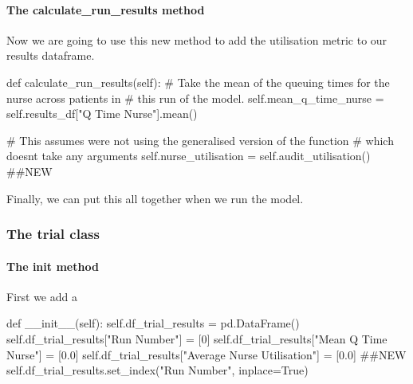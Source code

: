 \documentclass[
  letterpaper,
  DIV=11,
  numbers=noendperiod]{scrreprt}
\let\oldparagraph\paragraph
\renewcommand{\paragraph}[1]{\oldparagraph{#1}\mbox{}}
\newenvironment{Shaded}{\begin{snugshade}}{\end{snugshade}}
\newcommand{\CommentTok}[1]{\textcolor[rgb]{0.37,0.37,0.37}{#1}}
\newcommand{\DecValTok}[1]{\textcolor[rgb]{0.68,0.00,0.00}{#1}}
\newcommand{\FloatTok}[1]{\textcolor[rgb]{0.68,0.00,0.00}{#1}}
\newcommand{\FunctionTok}[1]{\textcolor[rgb]{0.28,0.35,0.67}{#1}}
\newcommand{\KeywordTok}[1]{\textcolor[rgb]{0.00,0.23,0.31}{#1}}
\newcommand{\NormalTok}[1]{\textcolor[rgb]{0.00,0.23,0.31}{#1}}
\newcommand{\OperatorTok}[1]{\textcolor[rgb]{0.37,0.37,0.37}{#1}}
\newcommand{\StringTok}[1]{\textcolor[rgb]{0.13,0.47,0.30}{#1}}
\newcommand{\VariableTok}[1]{\textcolor[rgb]{0.07,0.07,0.07}{#1}}
\begin{document}
\paragraph{The calculate\_run\_results
method}\label{the-calculate_run_results-method-3}

Now we are going to use this new method to add the utilisation metric to
our results dataframe.

\begin{Shaded}
\begin{Highlighting}[]
\KeywordTok{def}\NormalTok{ calculate\_run\_results(}\VariableTok{self}\NormalTok{):}
    \CommentTok{\# Take the mean of the queuing times for the nurse across patients in}
    \CommentTok{\# this run of the model.}
    \VariableTok{self}\NormalTok{.mean\_q\_time\_nurse }\OperatorTok{=} \VariableTok{self}\NormalTok{.results\_df[}\StringTok{"Q Time Nurse"}\NormalTok{].mean()}

    \CommentTok{\# This assumes we\textquotesingle{}re not using the generalised version of the function}
    \CommentTok{\# which doesn\textquotesingle{}t take any arguments}
    \VariableTok{self}\NormalTok{.nurse\_utilisation }\OperatorTok{=} \VariableTok{self}\NormalTok{.audit\_utilisation() }\CommentTok{\#\#NEW}
\end{Highlighting}
\end{Shaded}

Finally, we can put this all together when we run the model.

\subsubsection{The trial class}\label{the-trial-class-7}

\paragraph{\texorpdfstring{The \textbf{init}
method}{The init method}}\label{the-init-method-7}

First we add a

\begin{Shaded}
\begin{Highlighting}[]
\KeywordTok{def}  \FunctionTok{\_\_init\_\_}\NormalTok{(}\VariableTok{self}\NormalTok{):}
    \VariableTok{self}\NormalTok{.df\_trial\_results }\OperatorTok{=}\NormalTok{ pd.DataFrame()}
    \VariableTok{self}\NormalTok{.df\_trial\_results[}\StringTok{"Run Number"}\NormalTok{] }\OperatorTok{=}\NormalTok{ [}\DecValTok{0}\NormalTok{]}
    \VariableTok{self}\NormalTok{.df\_trial\_results[}\StringTok{"Mean Q Time Nurse"}\NormalTok{] }\OperatorTok{=}\NormalTok{ [}\FloatTok{0.0}\NormalTok{]}
    \VariableTok{self}\NormalTok{.df\_trial\_results[}\StringTok{"Average Nurse Utilisation"}\NormalTok{] }\OperatorTok{=}\NormalTok{ [}\FloatTok{0.0}\NormalTok{] }\CommentTok{\#\#NEW}
    \VariableTok{self}\NormalTok{.df\_trial\_results.set\_index(}\StringTok{"Run Number"}\NormalTok{, inplace}\OperatorTok{=}\VariableTok{True}\NormalTok{)}
\end{Highlighting}
\end{Shaded}
\end{document}
